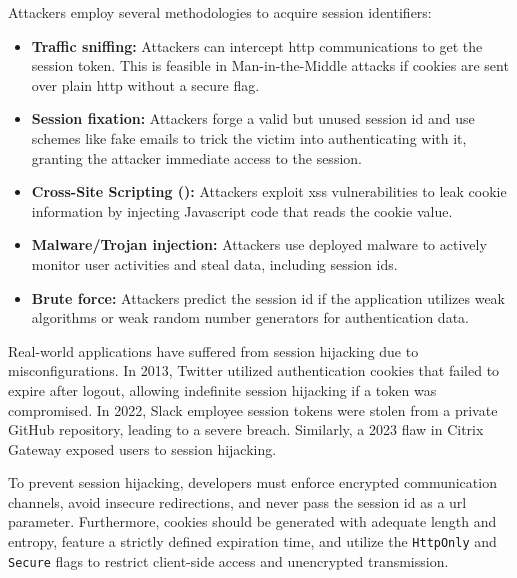 Attackers employ several methodologies to acquire session identifiers:
\begin{itemize}
    \item \textbf{Traffic sniffing:} Attackers can intercept \gls{http} communications to get the session token. This is feasible in Man-in-the-Middle attacks if cookies are sent over plain \gls{http} without a secure flag.
    \item \textbf{Session fixation:} Attackers forge a valid but unused session \gls{id} and use schemes like fake emails to trick the victim into authenticating with it, granting the attacker immediate access to the session.
    \item \textbf{Cross-Site Scripting ():} Attackers exploit \gls{xss} vulnerabilities to leak cookie information by injecting Javascript code that reads the cookie value.
    \item \textbf{Malware/Trojan injection:} Attackers use deployed malware to actively monitor user activities and steal data, including session \glspl{id}.
    \item \textbf{Brute force:} Attackers predict the session \gls{id} if the application utilizes weak algorithms or weak random number generators for authentication data.
\end{itemize}

Real-world applications have suffered from session hijacking due to misconfigurations. In 2013, Twitter utilized authentication cookies that failed to expire after logout, allowing indefinite session hijacking if a token was compromised. In 2022, Slack employee session tokens were stolen from a private GitHub repository, leading to a severe breach. Similarly, a 2023 flaw in Citrix Gateway exposed users to session hijacking.

To prevent session hijacking, developers must enforce encrypted communication channels, avoid insecure redirections, and never pass the session \gls{id} as a \gls{url} parameter. Furthermore, cookies should be generated with adequate length and entropy, feature a strictly defined expiration time, and utilize the \texttt{HttpOnly} and \texttt{Secure} flags to restrict client-side access and unencrypted transmission.

\section{\texorpdfstring{}{Cross-Site Request Forgery (CSRF)}}

